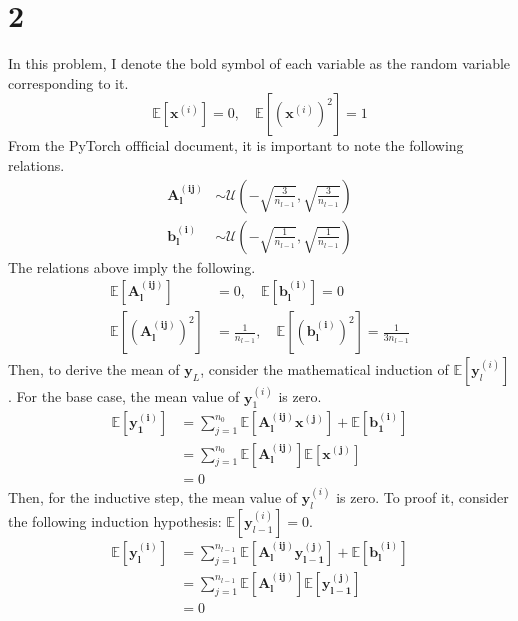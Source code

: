 \documentclass[10pt]{article}
\begin{document}
\section*{2}
In this problem, I denote the bold symbol of each variable as the random variable corresponding to it. 
\begin{equation*}
    \mathbb{E}[\mathbf{x}^{(i)}] = 0,\quad \mathbb{E}\left[\left(\mathbf{x}^{(i)}\right)^2\right] = 1
\end{equation*}
From the PyTorch offficial document, it is important to note the following relations.
\begin{align*}
    \mathbf{A_l^{(ij)}} &\sim \mathcal{U}\left(-\sqrt{\frac{3}{n_{l-1}}},\sqrt{\frac{3}{n_{l-1}}}\right)\\
    \mathbf{b_l^{(i)}} &\sim \mathcal{U}\left(-\sqrt{\frac{1}{n_{l-1}}},\sqrt{\frac{1}{n_{l-1}}}\right)
\end{align*}
The relations above imply the following. 
\begin{align*}
    \mathbb{E}[\mathbf{A_l^{(ij)}}] &= 0, \quad \mathbb{E}[\mathbf{b_l^{(i)}}] = 0\\ 
    \mathbb{E}\left[\left(\mathbf{A_l^{(ij)}}\right)^2\right] &= \frac{1}{n_{l-1}}, \quad \mathbb{E}\left[\left(\mathbf{b_l^{(i)}}\right)^2\right] = \frac{1}{3n_{l-1}} 
\end{align*}
Then, to derive the mean of $\mathbf{y}_L$, consider the mathematical induction of $\mathbb{E}[\mathbf{y}_l^{(i)}]$.
For the base case, the mean value of $\mathbf{y}^{(i)}_1$ is zero. 
\begin{align*}
    \mathbb{E}[\mathbf{y_1^{(i)}}] &= \sum_{j=1}^{n_0} \mathbb{E}\left[\mathbf{A_l^{(ij)}x^{(j)}}\right] + \mathbb{E}\left[\mathbf{b_1^{(i)}}\right] \\
    &= \sum_{j=1}^{n_0} \mathbb{E}\left[\mathbf{A_l^{(ij)}}\right]\mathbb{E}\left[\mathbf{x^{(j)}}\right] \\
    &= 0
\end{align*}
Then, for the inductive step, the mean value of $\mathbf{y}^{(i)}_l$ is zero. To proof it, consider the following induction hypothesis: $\mathbb{E}[\mathbf{y}^{(i)}_{l-1}] = 0$.
\begin{align*}
    \mathbb{E}[\mathbf{y_l^{(i)}}] &= \sum_{j=1}^{n_{l-1}} \mathbb{E}\left[\mathbf{A_l^{(ij)}y_{l-1}^{(j)}}\right] + \mathbb{E}\left[\mathbf{b_l^{(i)}}\right] \\
    &= \sum_{j=1}^{n_{l-1}} \mathbb{E}\left[\mathbf{A_l^{(ij)}}\right]\mathbb{E}\left[\mathbf{y_{l-1}^{(j)}}\right] \\
    &= 0
\end{align*}
\end{document}
